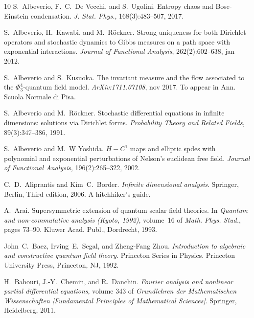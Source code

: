 \documentclass[a4paper,10pt]{article}
\newcommand{\tmtextit}[1]{{\itshape{#1}}}
\begin{document}
\begin{thebibliography}{10}
  S.~Albeverio, F.~C.~De Vecchi, and  S.~Ugolini.
  {\newblock}Entropy chaos and Bose-Einstein condensation.
  {\newblock}\tmtextit{J. Stat. Phys.}, 168(3):483--507, 2017.{\newblock}
  
  S.~Albeverio, H.~Kawabi, and 
  M.~R{\"o}ckner. {\newblock}Strong uniqueness for both Dirichlet operators
  and stochastic dynamics to Gibbs measures on a path space with exponential
  interactions. {\newblock}\tmtextit{Journal of Functional Analysis},
  262(2):602--638, jan 2012.{\newblock}
  
  S.~Albeverio  and  S.~Kusuoka.
  {\newblock}The invariant measure and the flow associated to the
  $\Phi^4_3$-quantum field model. {\newblock}\tmtextit{ArXiv:1711.07108}, nov
  2017. {\newblock}To appear in Ann. Scuola Normale di Pisa.{\newblock}
  
  S.~Albeverio  and  M.~R{\"o}ckner.
  {\newblock}Stochastic differential equations in infinite dimensions:
  solutions via Dirichlet forms. {\newblock}\tmtextit{Probability Theory and
  Related Fields}, 89(3):347--386, 1991.{\newblock}
  
  S.~Albeverio  and  M.~W Yoshida. {\newblock}$H -
  C^1$ maps and elliptic spdes with polynomial and exponential perturbations
  of Nelson's euclidean free field. {\newblock}\tmtextit{Journal of Functional
  Analysis}, 196(2):265--322, 2002.{\newblock}
  
  C.~D.~Aliprantis  and  Kim~C.~Border.
  {\newblock}\tmtextit{Infinite dimensional analysis}. {\newblock}Springer,
  Berlin, Third  edition, 2006. {\newblock}A hitchhiker's guide.{\newblock}
  
  A.~Arai. {\newblock}Supersymmetric
  extension of quantum scalar field theories. {\newblock}In \tmtextit{Quantum
  and non-commutative analysis (Kyoto, 1992)},  volume~16  of \tmtextit{Math.
  Phys. Stud.},  pages  73--90. Kluwer Acad. Publ., Dordrecht,
  1993.{\newblock}
  
  John~C.~Baez, Irving~E.~Segal, and  Zheng-Fang Zhou.
  {\newblock}\tmtextit{Introduction to algebraic and constructive quantum
  field theory}. {\newblock}Princeton Series in Physics. Princeton University
  Press, Princeton, NJ, 1992.{\newblock}
  
  H.~Bahouri, J.-Y.~Chemin, and  R.~Danchin.
  {\newblock}\tmtextit{Fourier analysis and nonlinear partial differential
  equations},  volume  343  of \tmtextit{Grundlehren der Mathematischen
  Wissenschaften [Fundamental Principles of Mathematical Sciences]}.
  {\newblock}Springer, Heidelberg, 2011.{\newblock}
  

\end{thebibliography}
\end{document}
